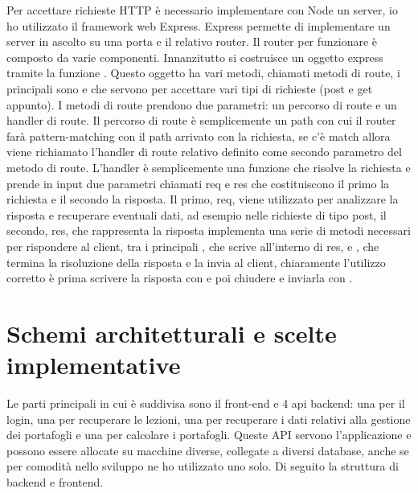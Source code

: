 \noindent
Per accettare richieste HTTP è necessario implementare con Node un server, io ho utilizzato il framework web Express. Express permette di implementare un server in ascolto su una porta e il relativo router. Il router per funzionare è composto da varie componenti. Innanzitutto si costruisce un oggetto express tramite la funzione . Questo oggetto ha vari metodi, chiamati metodi di route, i principali sono  e  che servono per accettare vari tipi di richieste (post e get appunto). I metodi di route prendono due parametri: un percorso di route e un handler di route. Il percorso di route è semplicemente un path con cui il router farà pattern-matching con il path arrivato con la richiesta, se c'è match allora viene richiamato l'handler di route relativo definito come secondo parametro del metodo di route. L'handler è semplicemente una funzione che risolve la richiesta e prende in input due parametri chiamati req e res che costituiscono il primo la richiesta e il secondo la risposta. Il primo, req, viene utilizzato per analizzare la risposta e recuperare eventuali dati, ad esempio nelle richieste di tipo post, il secondo, res, che rappresenta la risposta implementa una serie di metodi necessari per rispondere al client, tra i principali , che scrive  all'interno di res, e , che termina la risoluzione della risposta e la invia al client, chiaramente l'utilizzo corretto è prima scrivere la risposta con  e poi chiudere e inviarla con .





\vspace{1cm}

\section{Schemi architetturali e scelte implementative}

Le parti principali in cui è suddivisa sono il front-end e 4 api backend: una per il login, una per recuperare le lezioni, una per recuperare i dati relativi alla gestione dei portafogli e una per calcolare i portafogli. Queste API servono l'applicazione e possono essere allocate su macchine diverse, collegate a diversi database, anche se per comodità nello sviluppo ne ho utilizzato uno solo. Di seguito la struttura di backend e frontend. 


